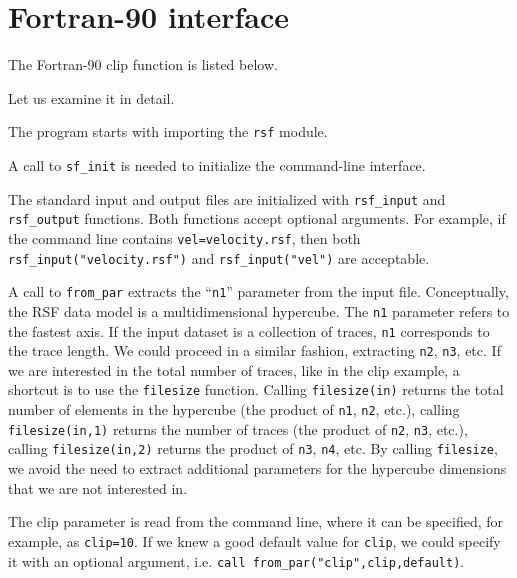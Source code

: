 \section{Fortran-90 interface}

\lstset{language=fortran}

The Fortran-90 clip function is listed below.



Let us examine it in detail.

 The
program starts with importing the \texttt{rsf} module.

 A
call to \texttt{sf\_init} is needed to initialize the command-line interface.

 The
standard input and output files are initialized with \texttt{rsf\_input} and
\texttt{rsf\_output} functions. Both functions accept optional arguments. For
example, if the command line contains \texttt{vel=velocity.rsf}, then both
\texttt{rsf\_input("velocity.rsf")} and \texttt{rsf\_input("vel")} are
acceptable.

 A
call to \texttt{from\_par} extracts the ``\texttt{n1}'' parameter from the
input file. Conceptually, the RSF data model is a multidimensional hypercube.
The \texttt{n1} parameter refers to the fastest axis. If the input dataset is
a collection of traces, \texttt{n1} corresponds to the trace length. We could
proceed in a similar fashion, extracting \texttt{n2}, \texttt{n3}, etc. If we
are interested in the total number of traces, like in the clip example, a
shortcut is to use the \texttt{filesize} function.  Calling
\texttt{filesize(in)} returns the total number of elements in the hypercube
(the product of \texttt{n1}, \texttt{n2}, etc.), calling
\texttt{filesize(in,1)} returns the number of traces (the product of
\texttt{n2}, \texttt{n3}, etc.), calling \texttt{filesize(in,2)} returns the
product of \texttt{n3}, \texttt{n4}, etc. By calling \texttt{filesize}, we
avoid the need to extract additional parameters for the hypercube dimensions
that we are not interested in.

 The
clip parameter is read from the command line, where it can be specified, for
example, as \texttt{clip=10}. If we knew a good default value for
\texttt{clip}, we could specify it with an optional argument,
i.e. \texttt{call~from\_par("clip",clip,default)}.

